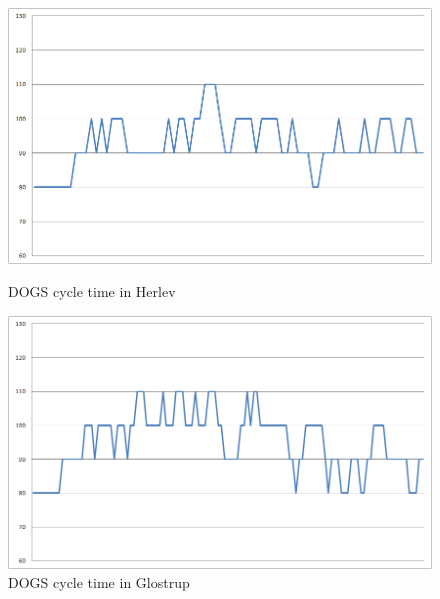 \begin{figure}[ht]

    \begin{minipage}[b]{0.5\linewidth}

\begin{center}
\includegraphics[scale=0.2]{C_dogs_herlev.png} 
\end{center}
\caption{DOGS cycle time in Herlev}
\label{fig:c_dogs_herlev}

    \end{minipage}
    \hspace{0.1cm}
    \begin{minipage}[b]{0.5\linewidth}

\begin{center}
\includegraphics[scale=0.2]{C_dogs_glostrup.png} 
\end{center}
\caption{DOGS cycle time in Glostrup}
\label{fig:c_dogs_glostrup}

    \end{minipage}
    

\end{figure}
